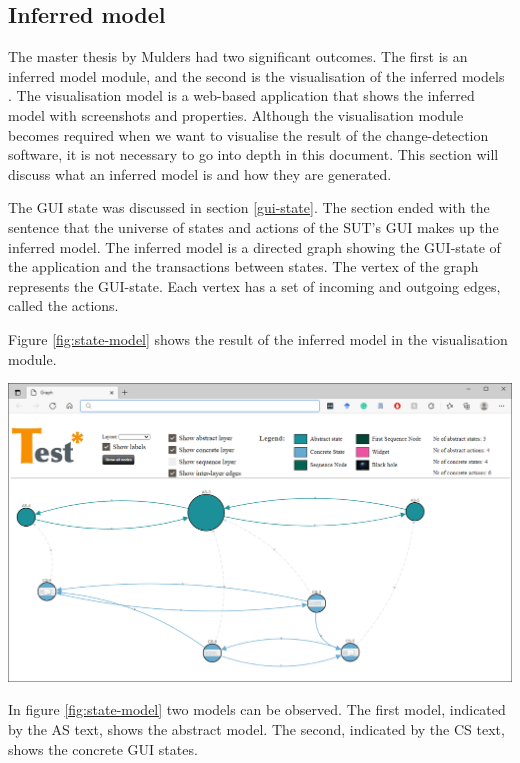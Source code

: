 \subsection{Inferred model} \label{inferred-model}
The master thesis by Mulders had two significant outcomes. The first is an inferred model module, and the second is the visualisation of the inferred models \cite{thesisMulders}. The visualisation model is a web-based application that shows the inferred model with screenshots and properties. Although the visualisation module becomes required when we want to visualise the result of the change-detection software, it is not necessary to go into depth in this document. This section will discuss what an inferred model is and how they are generated. 

The GUI state was discussed in section \ref{gui-state}. The section ended with the sentence that the universe of states and actions of the SUT's GUI makes up the inferred model. The inferred model is a directed graph showing the GUI-state of the application and the transactions between states. The vertex of the graph represents the GUI-state. Each vertex has a set of incoming and outgoing edges, called the actions. 

Figure \ref{fig:state-model} shows the result of the inferred model in the visualisation module.

\bigskip
\begingroup
\captionsetup{type=figure}
\includegraphics[scale=0.38]{images/state-model.png}
\label{fig:state-model}
\endgroup

In figure \ref{fig:state-model} two models can be observed. The first model, indicated by the AS text, shows the abstract model. The second, indicated by the CS text, shows the concrete GUI states. 

